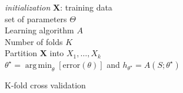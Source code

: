 \documentclass[../thesis.tex]{subfiles}
\begin{document}
\begin{algorithm}[H]{
\SetAlgoLined
\textit{initialization}\;
    \hspace{0.5cm} $\mathbf{X}$: training data\\
    \hspace{0.5cm} set of parameters $\Theta$\\
    \hspace{0.5cm} Learning algorithm $A$\\
    \hspace{0.5cm} Number of folds $K$\\
    Partition $\mathbf{X}$ into $X_1, \hdots, X_k$\\
    \Return $\theta^\star = \operatorname {arg\,min}_\theta\left[\text{error}(\theta) \right]$ and $h_{\theta^\star} = A \left(S;\theta^\star \right)$\\
}
\caption{K-fold cross validation}
\end{algorithm}
\end{document}

